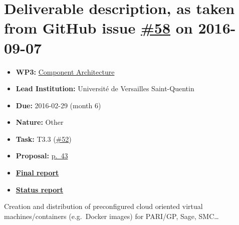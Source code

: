 \section*{\texorpdfstring{Deliverable description, as taken from GitHub
issue
\href{https://github.com/OpenDreamKit/OpenDreamKit/issues/58}{\#58} on
2016-09-07}{Deliverable description, as taken from GitHub issue \#58 on 2016-09-07}}\label{deliverable-description-as-taken-from-github-issue-58-on-2016-09-07}

\begin{itemize}
\tightlist
\item
  \textbf{WP3:}
  \href{https://github.com/OpenDreamKit/OpenDreamKit/tree/master/WP3}{Component
  Architecture}
\item
  \textbf{Lead Institution:} Université de Versailles Saint-Quentin
\item
  \textbf{Due:} 2016-02-29 (month 6)
\item
  \textbf{Nature:} Other
\item
  \textbf{Task:} T3.3
  (\href{https://github.com/OpenDreamKit/OpenDreamKit/issues/52}{\#52})
\item
  \textbf{Proposal:}
  \href{https://github.com/OpenDreamKit/OpenDreamKit/raw/master/Proposal/proposal-www.pdf}{p.~43}
\item
  \textbf{\href{https://github.com/OpenDreamKit/OpenDreamKit/raw/master/WP3/D3.1/report-final.pdf}{Final
  report}}
\item
  \textbf{\href{https://github.com/OpenDreamKit/OpenDreamKit/wiki/D3.1-Virtual-images-and-containers}{Status
  report}}
\end{itemize}

Creation and distribution of preconfigured cloud oriented virtual
machines/containers (e.g.~Docker images) for PARI/GP, Sage, SMC\ldots{}
